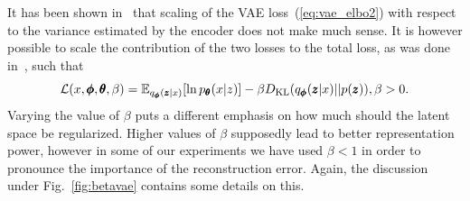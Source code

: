 It has been shown in~\cite{doersch2016tutorial} that scaling of
the VAE loss~(\ref{eq:vae_elbo2}) with respect to the variance
estimated by the encoder does not make much sense. It is however possible
to scale the contribution of the two losses to the total loss, as
was done in~\cite{higgins2017beta}, such that
\begin{equation}
\mathcal{L}(x,\vc{\phi},\vc{\theta},\beta)=\mathbb{E}_{q_{\vc{\phi}}(\vc{z}|x)}\left[\ln p_{\vc{\theta}}(x|z)\right]-\beta D_{\text{KL}}\left(q_{\vc{\phi}}(\vc{z}|x)||p(\vc{z})\right),\beta>0.\label{eq:betavae}
\end{equation}
Varying the value of $\beta$ puts a different emphasis on how much
should the latent space be regularized. Higher values of $\beta$
supposedly lead to better representation power, however in some of
our experiments we have used $\beta<1$ in order to pronounce the
importance of the reconstruction error. Again, the discussion under
Fig.~\ref{fig:betavae} contains some details on this.

